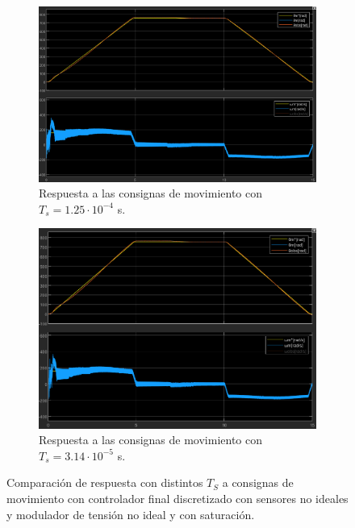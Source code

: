 \documentclass{article}
\begin{document}
\begin{figure}[H]
    \centering
    \begin{subfigure}[t]{0.45\textwidth}
        \centering
        \includegraphics[width=\textwidth]{Imagenes/RespuestaControladorDiscretizadoT125E-4.png}
        \caption{Respuesta a las consignas de movimiento con $T_s = 1.25 \cdot 10^{-4}$ s.}
        \label{fig:RespuestaControladorDiscretizadoT125E-4}
    \end{subfigure}
    \hfill %
    \begin{subfigure}[t]{0.4\textwidth}
        \centering
        \includegraphics[width=\textwidth]{Imagenes/RespuestaControladorDiscretizadoT314E-5.png}
        \caption{Respuesta a las consignas de movimiento con $T_s = 3.14 \cdot 10^{-5}$ s.}
        \label{fig:RespuestaControladorDiscretizadoT314E-5}
    \end{subfigure}
    \caption{Comparación de respuesta con distintos $T_S$ a consignas de movimiento con controlador final discretizado con sensores no ideales y modulador de tensión no ideal y con saturación.}
    \label{fig:RespuestaControladorDiscretizado}
\end{figure}
\end{document}
